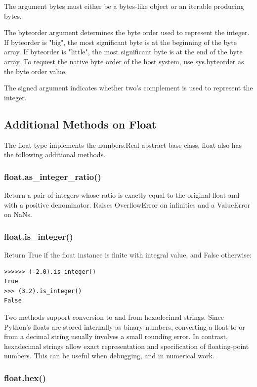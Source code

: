 The argument bytes must either be a bytes-like object or an iterable producing bytes.

The byteorder argument determines the byte order used to represent the integer. If byteorder is "big", the most significant byte is at the beginning of the byte array. If byteorder is "little", the most significant byte is at the end of the byte array. To request the native byte order of the host system, use sys.byteorder as the byte order value.

The signed argument indicates whether two’s complement is used to represent the integer.


\subsection{Additional Methods on Float}

The float type implements the numbers.Real abstract base class. float also has the following additional methods.

\subsubsection{float.as\_integer\_ratio()}

Return a pair of integers whose ratio is exactly equal to the original float and with a positive denominator. Raises OverflowError on infinities and a ValueError on NaNs.

\subsubsection{float.is\_integer()}

Return True if the float instance is finite with integral value, and False otherwise:

\begin{lstlisting}
>>>>>> (-2.0).is_integer()
True
>>> (3.2).is_integer()
False
\end{lstlisting}

Two methods support conversion to and from hexadecimal strings. Since Python's floats are stored internally as binary numbers, converting a float to or from a decimal string usually involves a small rounding error. In contrast, hexadecimal strings allow exact representation and specification of floating-point numbers. This can be useful when debugging, and in numerical work.

\subsubsection{float.hex()}

